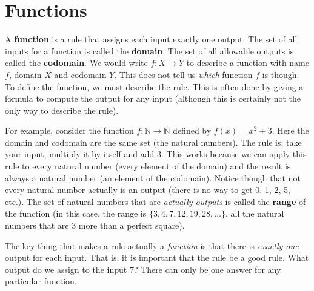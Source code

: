 \documentclass[10pt,]{book}
\newcommand{\terminology}[1]{\textbf{#1}}
\theoremstyle{plain}
\theoremstyle{definition}
\theoremstyle{definition}
\theoremstyle{definition}
\def\N{\mathbb N}
\begin{document}
\section[Functions]{Functions}\label{sec_intro-functions}
\typeout{************************************************}
\typeout{************************************************}

    A \terminology{function} is a rule that assigns each input exactly one output. The set of all inputs for a function is called the \terminology{domain}. The set of all allowable outputs is called the \terminology{codomain}. We would write \(f:X \to Y\) to describe a function with name \(f\), domain \(X\) and codomain \(Y\).  This does not tell us \emph{which} function \(f\) is though.  To define the function, we must describe the rule.  This is often done by giving a formula to compute the output for any input (although this is certainly not the only way to describe the rule).  %
\par
 For example, consider the function \(f:\N \to \N\) defined by \(f(x) = x^2 + 3\).  Here the domain and codomain are the same set (the natural numbers).  The rule is: take your input, multiply it by itself and add 3.  This works because we can apply this rule to every natural number (every element of the domain) and the result is always a natural number (an element of the codomain).  Notice though that not every natural number actually is an output (there is no way to get 0, 1, 2, 5, etc.).  The set of natural numbers that are \emph{actually outputs} is called the \terminology{range} of the function (in this case, the range is \(\{3, 4, 7, 12, 19, 28, \ldots\}\), all the natural numbers that are 3 more than a perfect square).
\par

      The key thing that makes a rule actually a \emph{function} is that there is \emph{exactly one} output for each input. That is, it is important that the rule be a good rule. What output do we assign to the input 7? There can only be one answer for any particular function.
\par
\end{document}
